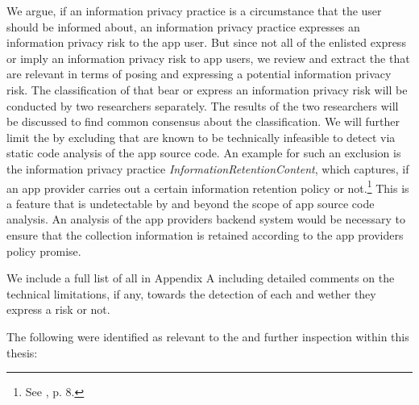 We argue, if an information privacy practice is a circumstance that the user should be informed about, an information privacy practice expresses an information privacy risk to the app user.
But since not all of the enlisted \ipp express or imply an information privacy risk to app users, we review and extract the \ipp that are relevant in terms of posing and expressing a potential information privacy risk.
The classification of \ipp that bear or express an information privacy risk will be conducted by two researchers separately.
The results of the two researchers will be discussed to find common consensus about the classification.
We will further limit the \ipp by excluding \ipp that are known to be technically infeasible to detect via static code analysis of the app source code.
An example for such an exclusion is the information privacy practice \textit{InformationRetentionContent}, which captures, if an app provider carries out a certain information retention policy or not.\footnote{See \cite{Dehling2016}, p. 8.}
This is a feature that is undetectable by \sca and beyond the scope of app source code analysis.
An analysis of the app providers backend system would be necessary to ensure that the collection information is retained according to the app providers policy promise.

We include a full list of all \ipp in Appendix A including detailed comments on the technical limitations, if any, towards the \sca detection of each \ipp and wether they express a risk or not.

The following \ipp were identified as relevant to the \sca and further inspection within this thesis:

